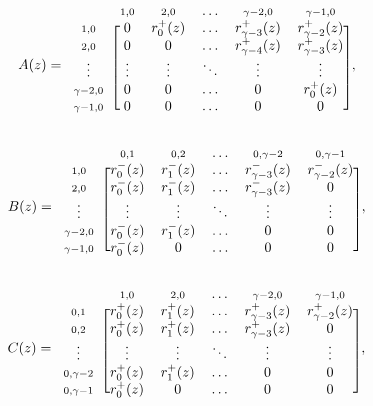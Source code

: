 \documentclass{article}
\begin{document}
\begin{equation*}
A(z) = 
\begin{blockarray}{cccccc}
   & \scriptstyle{1,0} & \scriptstyle{2,0} & \ldots &
    \scriptstyle{\gamma-2,0} & \scriptstyle{\gamma-1,0} \\
\begin{block}{c[ccccc]}
\scriptstyle{1,0} & 0 & r_0^+(z) & \ldots &
    r_{\gamma-3}^+(z) & r_{\gamma-2}^+(z) \\
\scriptstyle{2,0} & 0 & 0 & \ldots &
    r_{\gamma-4}^+(z) & r_{\gamma-3}^+(z) \\
\vdots & \vdots & \vdots & \ddots & \vdots & \vdots \\
\scriptstyle{\gamma-2,0} & 0 & 0 & \ldots & 0 & r_0^+(z) \\
\scriptstyle{\gamma-1,0} & 0 & 0 & \ldots & 0 & 0 \\
\end{block}
\end{blockarray},
\end{equation*}

\begin{equation*}
B(z) = 
\begin{blockarray}{cccccc}
   & \scriptstyle{0,1} & \scriptstyle{0,2} & \ldots &
    \scriptstyle{0,\gamma-2} & \scriptstyle{0,\gamma-1} \\
\begin{block}{c[ccccc]}
\scriptstyle{1,0} & r_0^-(z) & r_1^-(z) & \ldots &
    r_{\gamma-3}^-(z) & r_{\gamma-2}^-(z) \\
\scriptstyle{2,0} & r_0^-(z) & r_1^-(z) & \ldots &
    r_{\gamma-3}^-(z) & 0 \\
\vdots & \vdots & \vdots & \ddots & \vdots & \vdots \\
\scriptstyle{\gamma-2,0} & r_0^-(z) & r_1^-(z) & \ldots & 0 & 0 \\
\scriptstyle{\gamma-1,0} & r_0^-(z) & 0 & \ldots & 0 & 0 \\
\end{block}
\end{blockarray},
\end{equation*}

\begin{equation*}
C(z) = 
\begin{blockarray}{cccccc}
   & \scriptstyle{1,0} & \scriptstyle{2,0} & \ldots &
    \scriptstyle{\gamma-2,0} & \scriptstyle{\gamma-1,0} \\
\begin{block}{c[ccccc]}
\scriptstyle{0,1} & r_0^+(z) & r_1^+(z) & \ldots &
    r_{\gamma-3}^+(z) & r_{\gamma-2}^+(z) \\
\scriptstyle{0,2} & r_0^+(z) & r_1^+(z) & \ldots &
    r_{\gamma-3}^+(z) & 0 \\
\vdots & \vdots & \vdots & \ddots & \vdots & \vdots \\
\scriptstyle{0,\gamma-2} & r_0^+(z) & r_1^+(z) & \ldots & 0 & 0 \\
\scriptstyle{0,\gamma-1} & r_0^+(z) & 0 & \ldots & 0 & 0 \\
\end{block}
\end{blockarray},
\end{equation*}
\end{document}
